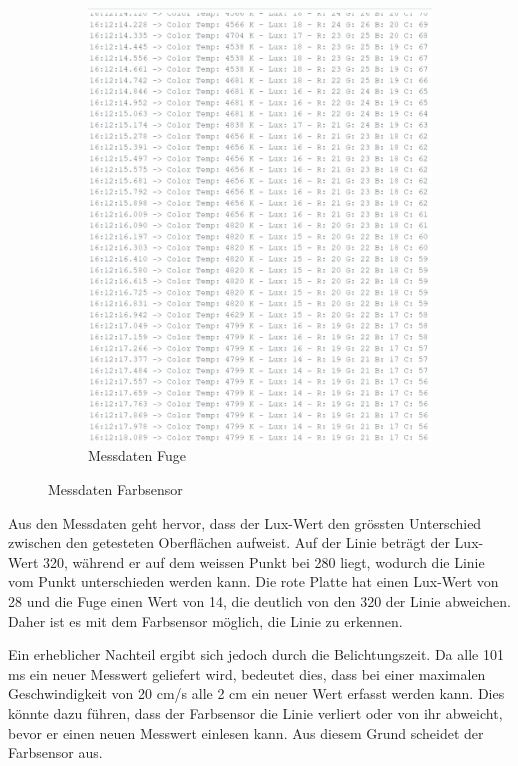 \documentclass[../main.tex]{subfiles}
\begin{document}
\begin{figure}[H]
\begin{subfigure}{0.35\textwidth}
        \includegraphics[width=\linewidth]{img/sensortest/MD_Fuge_101ms.png}
        \caption{Messdaten Fuge}
        \label{fig:MDFarbsensorFuge}
    \end{subfigure}

    \caption{Messdaten Farbsensor}
    \label{fig:Testanordnungen}
\end{figure}

Aus den Messdaten geht hervor, dass der Lux-Wert den grössten Unterschied zwischen den getesteten Oberflächen aufweist. Auf der Linie beträgt der Lux-Wert 320, während er auf dem weissen Punkt bei 280 liegt, wodurch die Linie vom Punkt unterschieden werden kann. Die rote Platte hat einen Lux-Wert von 28 und die Fuge einen Wert von 14, die deutlich von den 320 der Linie abweichen. Daher ist es mit dem Farbsensor möglich, die Linie zu erkennen.

Ein erheblicher Nachteil ergibt sich jedoch durch die Belichtungszeit. Da alle 101 ms ein neuer Messwert geliefert wird, bedeutet dies, dass bei einer maximalen Geschwindigkeit von 20 cm/s alle 2 cm ein neuer Wert erfasst werden kann. Dies könnte dazu führen, dass der Farbsensor die Linie verliert oder von ihr abweicht, bevor er einen neuen Messwert einlesen kann. Aus diesem Grund scheidet der Farbsensor aus.
\end{document}
